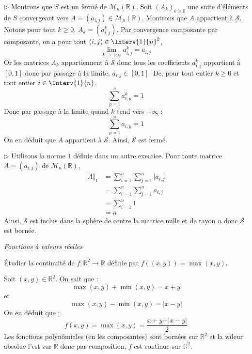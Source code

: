 \documentclass[a4paper,10pt]{report}
\begin{document}
\noindent $\rhd$ Montrons que $S$ est un fermé de $\mathcal{M}_n(\mathbb{R})$. Soit $(A_k)_{k \geq 0}$ une suite d'éléments de $S$ convergeant vers $A=(a_{i,j}) \in \mathcal{M}_n(\mathbb{R})$. Montrons que $A$ appartient à $\mathcal{S}$. Notons pour tout $k \geq 0$, $A_k = (a_{i,j}^k)$. Par convergence composante par composante, on a pour tout $(i,j) \in \Interv{1}{n}^2$,
$$ \lim_{k \rightarrow + \infty} a_{i,j}^k = a_{i,j}$$
Or les matrices $A_k$ appartiennent à $\mathcal{S}$ donc tous les coefficients $a_{i,j}^k$ appartient à $[0,1]$ donc par passage à la limite, $a_{i,j} \in [0,1]$. De, pour tout entier $k \geq 0$ et tout entier $i \in \Interv{1}{n}$,
$$ \sum_{p=1}^n a_{i,p}^k = 1$$
Donc par passage à la limite quand $k$ tend vers $+ \infty$ :
$$ \sum_{p=1}^n a_{i,p} = 1$$
On en déduit que $A$ appartient à $\mathcal{S}$. Ainsi, $\mathcal{S}$ est fermé.

\medskip

\noindent $\rhd$ Utilisons la norme $1$ définie dans un autre exercice. Pour toute matrice $A=(a_{i,j})$ de $\mathcal{M}_n(\mathbb{R})$,
\begin{align*}
\Vert A \Vert_1 & = \sum_{i = 1}^{n} \sum_{j = 1}^{n} \vert a_{i,j} \vert \\
& = \sum_{i = 1}^{n} \sum_{j = 1}^{n}  a_{i,j}  \\
 & = \sum_{i = 1}^{n} 1 \\
 & = n
\end{align*}
Ainsi, $\mathcal{S}$ est inclus dans la sphère de centre la matrice nulle et de rayon $n$ donc $\mathcal{S}$ est bornée.
\medskip

\begin{center}
\textit{{ {\large Fonctions à valeurs réelles}}}
\end{center}

\medskip



\begin{Exa} Étudier la continuité de $f : \mathbb{R}^2 \rightarrow \mathbb{R}$ définie par $ f((x,y))=  \max(x,y)$.
\end{Exa}

\corr Soit $(x,y) \in \mathbb{R}^2$. On sait que :
$$ \max(x,y)+ \min(x,y) = x+y$$
et 
$$ \max(x,y)-\min(x,y) = \vert x-y \vert$$
On en déduit que :
$$ f(x,y)= \max(x,y) = \dfrac{x+y+ \vert x-y \vert}{2}$$
Les fonctions polynômiales (en les composantes) sont bornées sur $\mathbb{R}^2$ et la valeur absolue l'est sur $\mathbb{R}$ donc par composition, $f$ est continue sur $\mathbb{R}^2$.
\end{document}
